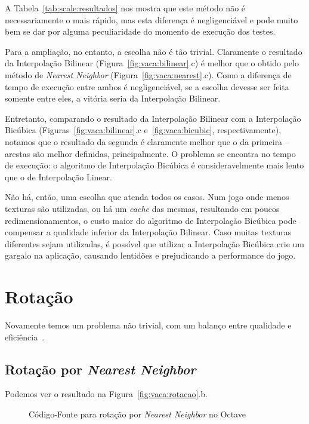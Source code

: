 \documentclass[12pt]{article}
\begin{document}
A Tabela~\ref{tab:scale:resultados} nos mostra que este método não é necessariamente o mais rápido, mas esta diferen\c{c}a é negligenciável e pode muito bem se dar por alguma peculiaridade do momento de execução dos testes.

Para a ampliação, no entanto, a escolha não é tão trivial. Claramente o resultado da Interpolação Bilinear (Figura~\ref{fig:vaca:bilinear}.c) é melhor que o obtido pelo método de \textit{Nearest Neighbor} (Figura~\ref{fig:vaca:nearest}.c). Como a diferen\c{c}a de tempo de execução entre ambos é negligenciável, se a escolha devesse ser feita somente entre eles, a vitória seria da Interpolação Bilinear.

Entretanto, comparando o resultado da Interpolação Bilinear com a Interpolação Bicúbica (Figuras~\ref{fig:vaca:bilinear}.c e~\ref{fig:vaca:bicubic}, respectivamente), notamos que o resultado da segunda é claramente melhor que o da primeira -- arestas são melhor definidas, principalmente. O problema se encontra no tempo de execução: o algoritmo de Interpolação Bicúbica é consideravelmente mais lento que o de Interpolação Linear.

Não há, então, uma escolha que atenda todos os casos. Num jogo onde menos texturas são utilizadas, ou há um \emph{cache} das mesmas, resultando em poucos redimensionamentos, o custo maior do algoritmo de Interpolação Bicúbica pode compensar a qualidade inferior da Interpolação Bilinear. Caso muitas texturas diferentes sejam utilizadas, é possível que utilizar a Interpolação Bicúbica crie um gargalo na aplica\c{c}ão, causando lentidões e prejudicando a performance do jogo.

\section{Rotação}\label{sec:rotacao}

Novamente temos um problema não trivial, com um balanço entre qualidade e eficiência~\cite{kopf:2011}.
\subsection{Rotação por \textit{Nearest Neighbor}}\label{sec:rotacao:nearest}

Podemos ver o resultado na Figura~\ref{fig:vaca:rotacao}.b.

\begin{figure}[H]

\caption{Código-Fonte para rotação por \textit{Nearest Neighbor} no Octave}
\label{lst:rotate:nearest}
\end{figure}
\end{document}
